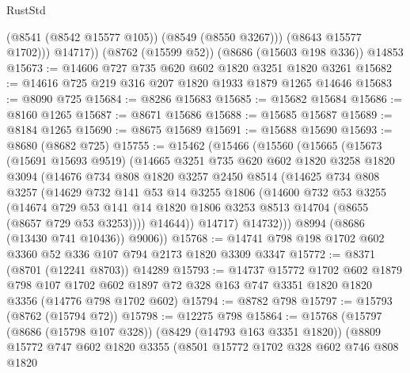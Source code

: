 \begin{lexlean}{RustStd}
\begin{coremodule}
              (@8541 (@8542 @15577 @105))
              (@8549 (@8550 @3267)))
            (@8643 @15577 @1702)))
        @14717))
    (@8762 (@15599 @52))
    (@8686 (@15603 @198 @336))
    @14853
@15673 := @14606 @727 @735 @620 @602 @1820 @3251 @1820 @3261
@15682 := @14616 @725 @219 @316 @207 @1820 @1933 @1879 @1265 @14646
@15683 := @8090 @725
@15684 := @8286 @15683
@15685 := @15682 @15684
@15686 := @8160 @1265
@15687 := @8671 @15686
@15688 := @15685 @15687
@15689 := @8184 @1265
@15690 := @8675 @15689
@15691 := @15688 @15690
@15693 := @8680 (@8682 @725)
@15755 := @15462
    (@15466
      (@15560
        (@15665
          (@15673
            (@15691 @15693 @9519)
            (@14665
              @3251
              @735
              @620
              @602
              @1820
              @3258
              @1820
              @3094
              (@14676
                @734
                @808
                @1820
                @3257
                @2450
                @8514
                (@14625
                  @734
                  @808
                  @3257
                  (@14629
                    @732
                    @141
                    @53
                    @14
                    @3255
                    @1806
                    (@14600
                      @732
                      @53
                      @3255
                      (@14674
                        @729
                        @53
                        @141
                        @14
                        @1820
                        @1806
                        @3253
                        @8513
                        @14704
                        (@8655 (@8657 @729 @53 @3253))))
                    @14644))
                @14717)
              @14732)))
        @8994
        (@8686 (@13430 @741 @10436))
        @9006))
@15768 := @14741 @798 @198 @1702 @602 @3360 @52 @336 @107 @794 @2173 @1820 @3309 @3347
@15772 := @8371 (@8701 (@12241 @8703)) @14289
@15793 := @14737
    @15772
    @1702
    @602
    @1879
    @798
    @107
    @1702
    @602
    @1897
    @72
    @328
    @163
    @747
    @3351
    @1820
    @1820
    @3356
    (@14776 @798 @1702 @602)
@15794 := @8782 @798
@15797 := @15793 (@8762 (@15794 @72))
@15798 := @12275 @798
@15864 := @15768
    (@15797
      (@8686 (@15798 @107 @328))
      (@8429 (@14793 @163 @3351 @1820))
      (@8809
        @15772
        @747
        @602
        @1820
        @3355
        (@8501
          @15772
          @1702
          @328
          @602
          @746
          @808
          @1820

\end{coremodule}
\end{lexlean}
